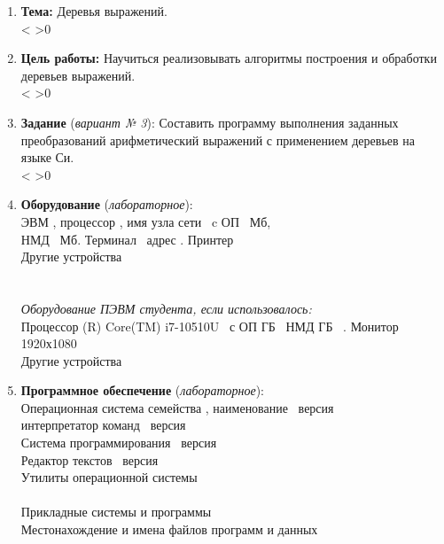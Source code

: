 \documentclass[a4paper]{article}
\makeatletter
\newcounter{i}
\newcommand{\PrintEmptyLines}[1]{\setcounter{i}{1}\@whilenum\value{i}<#1\do{\stepcounter{i}\EmptyLine\\} \ifnum #1>0 {\EmptyLine}\fi}
\newcommand\arulefill[1]{{\expandafter \ulined #1 \hfill}}
\newcommand{\EmptyLine}{\null\arulefill{}}
\newcounter{EmptyLines1}
\newcounter{EmptyLines2}
\newcounter{EmptyLines3}
\newcounter{EmptyLines10}
\newcounter{EmptyLines11}
\newcounter{EmptyLines12}
\newcommand{\NumberVariant}{3}  %
\newcommand{\Texti}{}  %
\newcommand{\Textii}{
}  %
\newcommand{\Textiii}{
}  %
\makeatother
\begin{document}
\begin{enumerate}[label=\textbf{\arabic*}.]

\item \textbf{Тема:} {\footnotesize Деревья выражений.} \arulefill{\Texti} \\ 
\PrintEmptyLines{\value{EmptyLines1}}

\item \textbf{Цель работы:} {\footnotesize Научиться реализовывать алгоритмы построения и обработки деревьев выражений.} \arulefill{\Textii} \\
\PrintEmptyLines{\value{EmptyLines2}}

\item \textbf{Задание} (\textit{вариант № \NumberVariant}): {\footnotesize Составить программу выполнения заданных преобразований арифметический выражений с применением деревьев на языке Си.} \arulefill{\Textiii} \\
\PrintEmptyLines{\value{EmptyLines3}}

\item \textbf{Оборудование} (\textit{лабораторное}):\\
ЭВМ \EmptyLine, процессор \EmptyLine, имя узла сети \EmptyLine \ c ОП \EmptyLine \ Мб,\\
НМД \EmptyLine \ Мб. Терминал \EmptyLine \ адрес \EmptyLine. Принтер \EmptyLine \\
Другие устройства \EmptyLine \\ \EmptyLine \\\\

\textit{Оборудование ПЭВМ студента, если использовалось:}\\
Процессор \arulefill{Intel(R) Core(TM) i7-10510U}\EmptyLine \ с ОП \arulefill{8 ГБ}\EmptyLine \, НМД \arulefill{SSD 512 ГБ}\EmptyLine \ . Монитор \arulefill{Встроенный 1920х1080}\EmptyLine \\
Другие устройства \arulefill{}\EmptyLine \\ \EmptyLine

\item \textbf{Программное обеспечение} (\textit{лабораторное}):\\
Операционная система семейства \EmptyLine, наименование \EmptyLine \ версия \EmptyLine \\
интерпретатор команд \EmptyLine \ версия \EmptyLine \\
Система программирования \EmptyLine \ версия \EmptyLine \\
Редактор текстов \EmptyLine \ версия \EmptyLine \\
Утилиты операционной системы \EmptyLine \\ \EmptyLine \\
Прикладные системы и программы \EmptyLine \\
Местонахождение и имена файлов программ и данных \EmptyLine \\ \EmptyLine \\\\


\end{enumerate}
\end{document}
